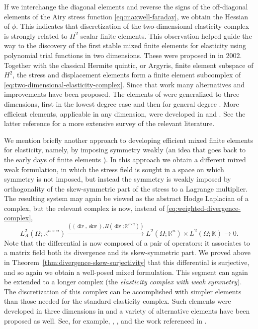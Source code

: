 {If we interchange the diagonal elements and reverse the signs of the off-diagonal elements of the Airy stress function \eqref{eq:maxwell-faraday}, we obtain the Hessian of $\phi$. This indicates that discretization of the two-dimensional elasticity complex is strongly related to $H^2$ scalar finite elements. This observation helped guide the way to the discovery of the first stable mixed finite elements for elasticity using polynomial trial functions in two dimensions. These were proposed in  in 2002. Together with the classical Hermite quintic, or Argyris, finite element subspace of $H^2$, the stress and displacement elements form a finite element subcomplex of \eqref{eq:two-dimensional-elasticity-complex}. Since that work many alternatives and improvements have been proposed. The elements of  were generalized to three dimensions, first in the lowest degree case  and then for general degree . More efficient elements, applicable in any dimension, were developed in  and . See the latter reference for a more extensive survey of the relevant literature.}

{We mention briefly another approach to developing efficient mixed finite elements for elasticity, namely, by imposing symmetry weakly (an idea that goes back to the early days of finite elements ). In this approach we obtain a different mixed weak formulation, in which the stress field is sought in a space on which symmetry is not imposed, but instead the symmetry is weakly imposed by orthogonality of the skew-symmetric part of the stress to a Lagrange multiplier. The resulting system may again be viewed as the abstract Hodge Laplacian of a complex, but the relevant complex is now, instead of \eqref{eq:weighted-divergence-complex},}
\[
L_A^2(\Omega;\mathbb R^{n\times n})\xrightarrow{((\operatorname{div},\operatorname{skw}),H(\operatorname{div};\mathbb R^{2\times2}))}L^2(\Omega;\mathbb R^n)\times L^2(\Omega;\mathbb K)\to0.
\]
{Note that the differential is now composed of a pair of operators: it associates to a matrix field both its divergence and its skew-symmetric part. We proved above in Theorem~\ref{thm:divergence-skew-surjectivity} that this differential is surjective, and so again we obtain a well-posed mixed formulation. This segment can again be extended to a longer complex (the \emph{elasticity complex with weak symmetry}). The discretization of this complex can be accomplished with simpler elements than those needed for the standard elasticity complex. Such elements were developed in three dimensions in  and a variety of alternative elements have been proposed as well. See, for example, , , and the work referenced in .}
